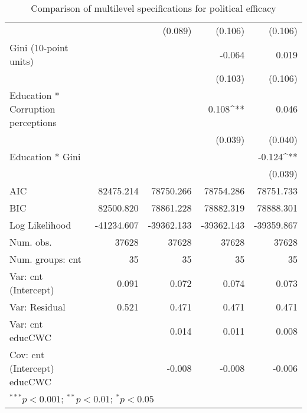 \begin{table}
\begin{center}
\begin{tabular}{l D{.}{.}{6.6} D{.}{.}{6.6} D{.}{.}{6.6} D{.}{.}{6.6}}
                                   &             & (0.089)      & (0.106)      & (0.106)      \\
Gini (10-point units)              &             &              & -0.064       & 0.019        \\
                                   &             &              & (0.103)      & (0.106)      \\
Education * Corruption perceptions &             &              & 0.108^{**}   & 0.046        \\
                                   &             &              & (0.039)      & (0.040)      \\
Education * Gini                   &             &              &              & -0.124^{**}  \\
                                   &             &              &              & (0.039)      \\
\midrule
AIC                                & 82475.214   & 78750.266    & 78754.286    & 78751.733    \\
BIC                                & 82500.820   & 78861.228    & 78882.319    & 78888.301    \\
Log Likelihood                     & -41234.607  & -39362.133   & -39362.143   & -39359.867   \\
Num. obs.                          & 37628       & 37628        & 37628        & 37628        \\
Num. groups: cnt                   & 35          & 35           & 35           & 35           \\
Var: cnt (Intercept)               & 0.091       & 0.072        & 0.074        & 0.073        \\
Var: Residual                      & 0.521       & 0.471        & 0.471        & 0.471        \\
Var: cnt educCWC                   &             & 0.014        & 0.011        & 0.008        \\
Cov: cnt (Intercept) educCWC       &             & -0.008       & -0.008       & -0.006       \\
\bottomrule
{}
\end{tabular}
\caption{Comparison of multilevel specifications for political efficacy}
\label{table:coefficients}
\end{center}
\end{table}
